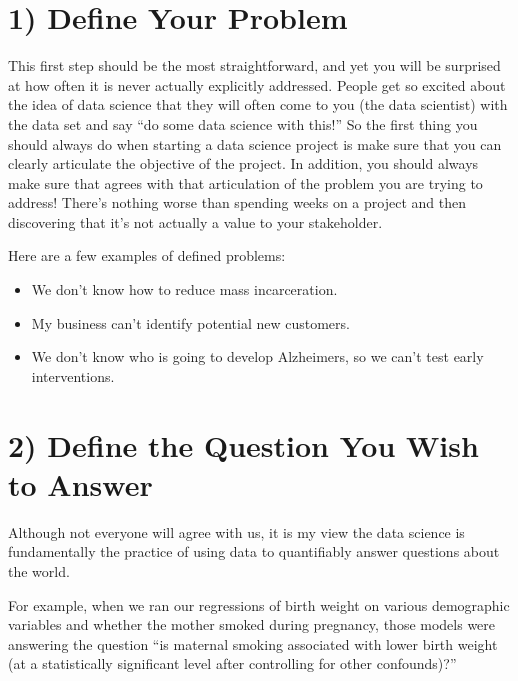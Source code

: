 \documentclass[letterpaper,10pt,english]{jupyterBook}
\begin{document}
\section{1) Define Your Problem}
\label{\detokenize{40_in_practice/05_backwards_design:define-your-problem}}
\sphinxAtStartPar
This first step should be the most straightforward, and yet you will be surprised at how often it is never actually explicitly addressed. People get so excited about the idea of data science that they will often come to you (the data scientist) with the data set and say “do some data science with this!” So the first thing you should always do when starting a data science project is make sure that you can clearly articulate the objective of the project. In addition, you should always make sure that  agrees with that articulation of the problem you are trying to address! There’s nothing worse than spending weeks on a project and then discovering that it’s not actually a value to your stakeholder.

\sphinxAtStartPar
Here are a few examples of defined problems:
\begin{itemize}
\item {} 
\sphinxAtStartPar
We don’t know how to reduce mass incarceration.

\item {} 
\sphinxAtStartPar
My business can’t identify potential new customers.

\item {} 
\sphinxAtStartPar
We don’t know who is going to develop Alzheimers, so we can’t test early interventions.

\end{itemize}


\section{2) Define the Question You Wish to Answer}
\label{\detokenize{40_in_practice/05_backwards_design:define-the-question-you-wish-to-answer}}
\sphinxAtStartPar
Although not everyone will agree with us, it is my view the data science is fundamentally the practice of using data to quantifiably answer questions about the world.

\sphinxAtStartPar
For example, when we ran our regressions of birth weight on various demographic variables and whether the mother smoked during pregnancy, those models were answering the question “is maternal smoking associated with lower birth weight (at a statistically significant level after controlling for other confounds)?”
\end{document}
